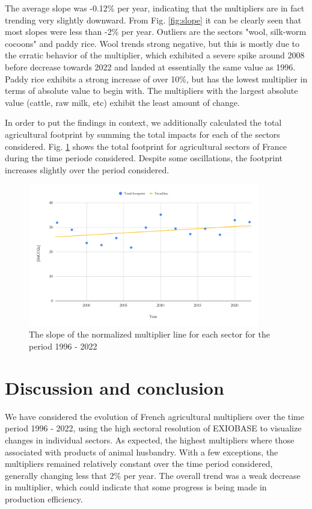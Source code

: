 \documentclass[a4paper,twoside]{article}
\begin{document}
The average slope was -0.12\% per year, indicating that the multipliers are in fact trending very slightly downward. From Fig. \ref{fig:slope} it can be clearly seen that most slopes were less than -2\% per year. Outliers are the sectors "wool, silk-worm cocoons" and paddy rice. Wool trends strong negative, but this is mostly due to the erratic behavior of the multiplier, which exhibited a severe spike around 2008 before decrease towards 2022 and landed at essentially the same value as 1996. Paddy rice exhibits a strong increase of over 10\%, but has the lowest multiplier in terms of absolute value to begin with. The multipliers with the largest absolute value (cattle, raw milk, etc) exhibit the least amount of change.

In order to put the findings in context, we additionally calculated the total agricultural footprint by summing the total impacts for each of the sectors considered. Fig. \ref{fig:totalfootprint} shows the total footprint for agricultural sectors of France during the time periode considered. Despite some oscillations, the footprint increases slightly over the period considered.

\begin{figure}[H]
\centering
\includegraphics[width=0.9\textwidth]{totalfootprint}
\caption{The slope of the normalized multiplier line for each sector for the period 1996 - 2022}\label{fig:totalfootprint} 
\end{figure}

\section{Discussion and conclusion}

We have considered the evolution of French agricultural multipliers over the time period 1996 - 2022, using the high sectoral resolution of EXIOBASE to visualize changes in individual sectors. As expected, the highest multipliers where those associated with products of animal husbandry. With a few exceptions, the multipliers remained relatively constant over the time period considered, generally changing less that 2\% per year. The overall trend was a weak decrease in multiplier, which could indicate that some progress is being made in production efficiency.
\end{document}
